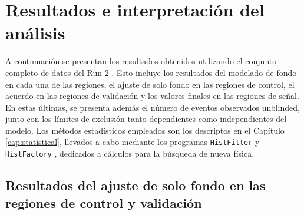 
\section{Resultados e interpretación del análisis}

A continuación se presentan los resultados obtenidos utilizando el conjunto completo de datos del Run 2 \cite{ATLAS:2021ijy}. Esto incluye los resultados del modelado de fondo en cada una de las regiones, el ajuste de solo fondo en las regiones de control, el acuerdo en las regiones de validación y los valores finales en las regiones de señal. En estas últimas, se presenta además el número de eventos observados unblinded, junto con los límites de exclusión tanto dependientes como independientes del modelo. Los métodos estadísticos empleados son los descriptos en el Capítulo \ref{cap:statistical}, llevados a cabo mediante los programas \texttt{HistFitter} \cite{Baak_2015} y \texttt{HistFactory} \cite{Cranmer:1456844}, dedicados a cálculos para la búsqueda de nueva física.

\subsection{Resultados del ajuste de solo fondo en las regiones de control y validación}


